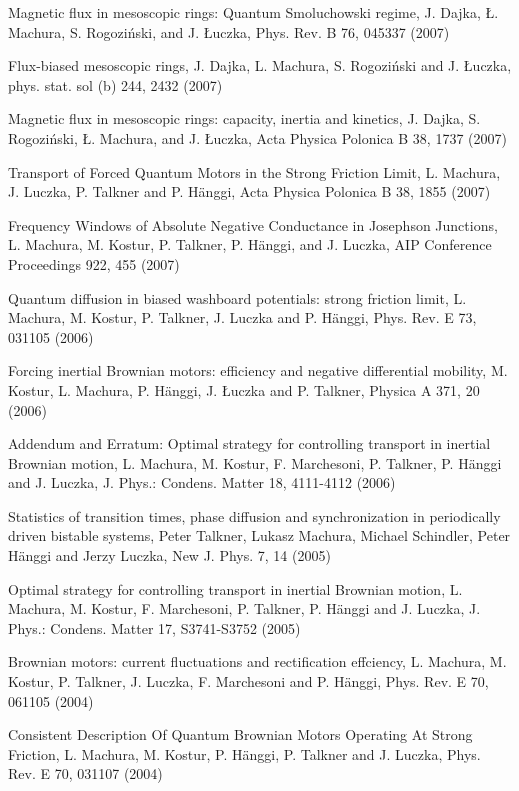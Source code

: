 \begin{etaremune}
\item Magnetic flux in mesoscopic rings: Quantum Smoluchowski regime, J. Dajka, Ł. Machura, S. Rogoziński, and J. Łuczka, Phys. Rev. B 76,  045337 (2007)

\item Flux-biased mesoscopic rings, J. Dajka, L. Machura, S. Rogoziński and J. Łuczka, phys. stat. sol (b) 244,  2432 (2007)

\item Magnetic flux in mesoscopic rings: capacity, inertia and kinetics, J. Dajka, S. Rogoziński, Ł. Machura, and J. Łuczka, Acta Physica Polonica B 38,  1737 (2007)

\item Transport of Forced Quantum Motors in the Strong Friction Limit, L. Machura, J. Luczka, P. Talkner and P. Hänggi, Acta Physica Polonica B 38,  1855 (2007)

\item Frequency Windows of Absolute Negative Conductance in Josephson Junctions, L. Machura, M. Kostur, P. Talkner, P. Hänggi, and J. Luczka, AIP Conference Proceedings 922,  455 (2007)

\item Quantum diffusion in biased washboard potentials: strong friction limit, L. Machura, M. Kostur, P. Talkner, J. Luczka and P. Hänggi, Phys. Rev. E 73,  031105 (2006)

\item Forcing inertial Brownian motors: efficiency and negative differential mobility, M. Kostur, L. Machura, P. Hänggi, J. Łuczka and P. Talkner, Physica A 371,  20 (2006)

\item Addendum and Erratum: Optimal strategy for controlling transport in inertial Brownian motion, L. Machura, M. Kostur, F. Marchesoni, P. Talkner, P. Hänggi and J. Luczka, J. Phys.: Condens. Matter 18,  4111-4112 (2006)

\item Statistics of transition times, phase diffusion and synchronization in periodically driven bistable systems, Peter Talkner, Lukasz Machura, Michael Schindler, Peter Hänggi and Jerzy Luczka, New J. Phys. 7,  14 (2005)

\item Optimal strategy for controlling transport in inertial Brownian motion, L. Machura, M. Kostur, F. Marchesoni, P. Talkner, P. Hänggi and J. Luczka, J. Phys.: Condens. Matter 17,  S3741-S3752 (2005)

\item Brownian motors: current fluctuations and rectification effciency, L. Machura, M. Kostur, P. Talkner, J. Luczka, F. Marchesoni and P. Hänggi, Phys. Rev. E 70,  061105 (2004)

\item Consistent Description Of Quantum Brownian Motors Operating At Strong Friction, L. Machura, M. Kostur, P. Hänggi, P. Talkner and J. Luczka, Phys. Rev. E 70,  031107 (2004)

\end{etaremune}